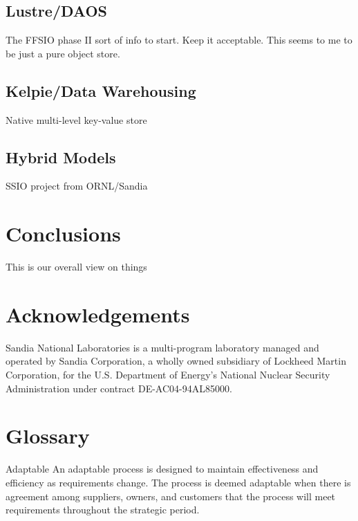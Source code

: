 \subsection{Lustre/DAOS}

The FFSIO phase II sort of info to start. Keep it acceptable. This seems to me
to be just a pure object store.

\subsection{Kelpie/Data Warehousing}

Native multi-level key-value store

\subsection{Hybrid Models}

SSIO project from ORNL/Sandia

\section{Conclusions}\label{sec:intro}

This is our overall view on things

\section*{Acknowledgements}
Sandia National Laboratories is a multi-program laboratory managed and operated
by Sandia Corporation, a wholly owned subsidiary of Lockheed Martin
Corporation, for the U.S. Department of Energy's National Nuclear Security
Administration under contract DE-AC04-94AL85000.



\section{Glossary}
\begin{Glossary}
\item[Adaptable] An adaptable process is designed to maintain effectiveness and
efficiency as requirements change. The process is deemed adaptable when there
is agreement among suppliers, owners, and customers that the process will meet
requirements throughout the strategic period.
\end{Glossary}

